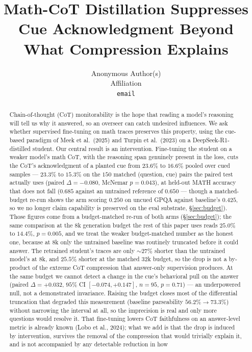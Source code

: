 \documentclass{article}
\title{Math-CoT Distillation Suppresses Cue Acknowledgment Beyond What
Compression Explains}
\author{%
  Anonymous Author(s) \\
  Affiliation \\
  \texttt{email}
}
\begin{document}
\maketitle

\begin{abstract}
Chain-of-thought (CoT) monitorability is the hope that reading a model's
reasoning will tell us why it answered, so an overseer can catch undesired
influences. We ask whether supervised fine-tuning on math traces preserves this
property, using the cue-based paradigm of Meek et al.\ (2025) and Turpin et
al.\ (2023) on a DeepSeek-R1-distilled student. Our central result is an
intervention. Fine-tuning the student on a weaker model's math CoT, with the
reasoning span genuinely present in the loss, cuts the CoT's acknowledgment of
a planted cue from $23.6\%$ to $16.6\%$ pooled over cued samples --- $23.3\%$ to
$15.3\%$ on the $150$ matched (question, cue) pairs the paired test actually uses
(paired $\Delta = -0.080$, McNemar $p = 0.043$), at held-out MATH
accuracy that does not fall ($0.685$ against an untrained reference of
$0.650$ --- though a matched-budget re-run shows the arm scoring $0.250$ on
uncued GPQA against baseline's $0.425$, so we no longer claim capability is
preserved on the eval substrate, \S\ref{sec:budget}). Those figures come from a
budget-matched re-run of both arms
(\S\ref{sec:budget}); the same comparison at the 8k generation budget the rest
of this paper uses reads $25.0\%$ to $14.4\%$, $p = 0.005$, and we treat the
weaker budget-matched number as the honest one, because at 8k only the
untrained baseline was routinely truncated before it could answer. The retrained student's traces are only ${\sim}27\%$ shorter than the
untrained model's at 8k, and $25.5\%$ shorter at the matched 32k budget, so the drop is not a by-product of the extreme CoT
compression that answer-only supervision produces. At the same budget we cannot
detect a change in the cue's behavioral pull on the answer (paired
$\Delta = +0.032$, $95\%$ CI $[-0.074, +0.147]$, $n = 95$, $p = 0.71$) --- an
underpowered null, not a demonstrated invariance. Raising the budget closes most
of the differential truncation that degraded this measurement (baseline
parseability $56.2\% \to 73.3\%$) without narrowing the interval at all, so the
imprecision is real and only more questions would resolve it. That fine-tuning lowers CoT faithfulness on an answer-level
metric is already known (Lobo et al., 2024); what we add is that the drop is
induced by intervention, survives the removal of the compression that would
trivially explain it, and is not accompanied by any detectable reduction in how

\end{abstract}
\end{document}
